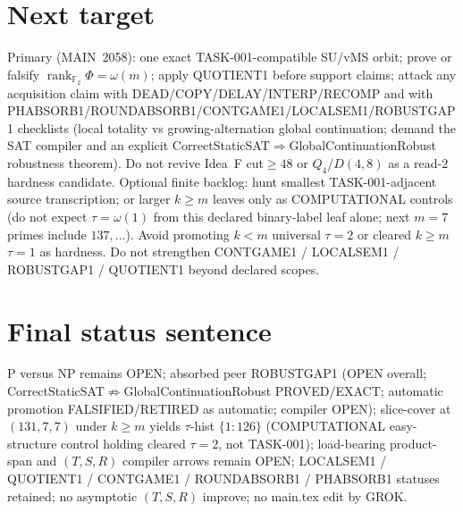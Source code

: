 \documentclass[11pt]{article}
\begin{document}
\section*{Next target}
Primary (MAIN~2058): one exact TASK-001-compatible SU/vMS orbit; prove or falsify
$\operatorname{rank}_{\mathbb F_2}\Phi=\omega(m)$; apply QUOTIENT1 before support claims;
attack any acquisition claim with
DEAD/COPY/DELAY/INTERP/RECOMP and with PHABSORB1/ROUNDABSORB1/CONTGAME1/LOCALSEM1/ROBUSTGAP1 checklists
(local totality vs growing-alternation global continuation; demand the SAT compiler and an
explicit CorrectStaticSAT$\Rightarrow$GlobalContinuationRobust robustness theorem).
Do not revive Idea~F cut$\ge48$ or $Q_4$/$D(4,8)$ as a read-$2$ hardness candidate.
Optional finite backlog: hunt smallest TASK-001-adjacent source transcription;
or larger $k{\ge}m$ leaves only as COMPUTATIONAL controls (do not expect $\tau=\omega(1)$
from this declared binary-label leaf alone; next $m{=}7$ primes include $137,\ldots$).
Avoid promoting $k{<}m$ universal $\tau{=}2$ or cleared $k{\ge}m$ $\tau{=}1$ as hardness.
Do not strengthen CONTGAME1 / LOCALSEM1 / ROBUSTGAP1 / QUOTIENT1 beyond declared scopes.

\section*{Final status sentence}
P versus NP remains OPEN; absorbed peer ROBUSTGAP1 (OPEN overall; CorrectStaticSAT$\not\Rightarrow$GlobalContinuationRobust PROVED/EXACT; automatic promotion FALSIFIED/RETIRED as automatic; compiler OPEN); slice-cover at $(131,7,7)$ under $k{\ge}m$ yields $\tau$-hist $\{1{:}126\}$ (COMPUTATIONAL easy-structure control holding cleared $\tau{=}2$, not TASK-001); load-bearing product-span and $(T,S,R)$ compiler arrows remain OPEN; LOCALSEM1 / QUOTIENT1 / CONTGAME1 / ROUNDABSORB1 / PHABSORB1 statuses retained; no asymptotic $(T,S,R)$ improve; no main.tex edit by GROK.
\end{document}
